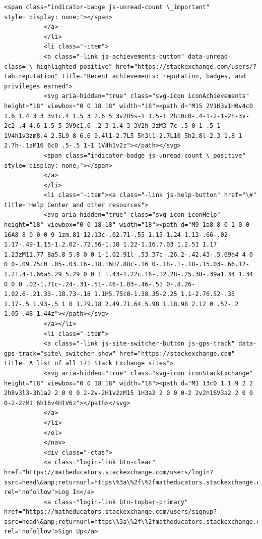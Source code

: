 \documentclass[11pt]{article}
\begin{document}
\begin{Verbatim}[commandchars=\\\{\}]
           <span class="indicator-badge js-unread-count \_important" style="display: none;"></span>
           </a>
           </li>
           <li class="-item">
           <a class="-link js-achievements-button" data-unread-class="\_highlighted-positive" href="https://stackexchange.com/users/?tab=reputation" title="Recent achievements: reputation, badges, and privileges earned">
           <svg aria-hidden="true" class="svg-icon iconAchievements" height="18" viewbox="0 0 18 18" width="18"><path d="M15 2V1H3v1H0v4c0 1.6 1.4 3 3 3v1c.4 1.5 3 2.6 5 3v2H5s-1 1.5-1 2h10c0-.4-1-2-1-2h-3v-2c2-.4 4.6-1.5 5-3V9c1.6-.2 3-1.4 3-3V2h-3zM3 7c-.5 0-1-.5-1-1V4h1v3zm8.4 2.5L9 8 6.6 9.4l1-2.7L5 5h3l1-2.7L10 5h2.8l-2.3 1.8 1 2.7h-.1zM16 6c0 .5-.5 1-1 1V4h1v2z"></path></svg>
           <span class="indicator-badge js-unread-count \_positive" style="display: none;"></span>
           </a>
           </li>
           <li class="-item"><a class="-link js-help-button" href="\#" title="Help Center and other resources">
           <svg aria-hidden="true" class="svg-icon iconHelp" height="18" viewbox="0 0 18 18" width="18"><path d="M9 1a8 8 0 1 0 0 16A8 8 0 0 0 9 1zm.81 12.13c-.02.71-.55 1.15-1.24 1.13-.66-.02-1.17-.49-1.15-1.2.02-.72.56-1.18 1.22-1.16.7.03 1.2.51 1.17 1.23zM11.77 8a5.8 5.8 0 0 1-1.02.91l-.53.37c-.26.2-.42.43-.5.69a4 4 0 0 0-.09.75c0 .05-.03.16-.18.16H7.88c-.16 0-.18-.1-.18-.15.03-.66.12-1.21.4-1.66a5.29 5.29 0 0 1 1.43-1.22c.16-.12.28-.25.38-.39a1.34 1.34 0 0 0 .02-1.71c-.24-.31-.51-.46-1.03-.46-.51 0-.8.26-1.02.6-.21.33-.18.73-.18 1.1H5.75c0-1.38.35-2.25 1.1-2.76.52-.35 1.17-.5 1.93-.5 1 0 1.79.18 2.49.71.64.5.98 1.18.98 2.12 0 .57-.2 1.05-.48 1.44z"></path></svg>
           </a></li>
           <li class="-item">
           <a class="-link js-site-switcher-button js-gps-track" data-gps-track="site\_switcher.show" href="https://stackexchange.com" title="A list of all 171 Stack Exchange sites">
           <svg aria-hidden="true" class="svg-icon iconStackExchange" height="18" viewbox="0 0 18 18" width="18"><path d="M1 13c0 1.1.9 2 2 2h8v3l3-3h1a2 2 0 0 0 2-2v-2H1v2zM15 1H3a2 2 0 0 0-2 2v2h16V3a2 2 0 0 0-2-2zM1 6h16v4H1V6z"></path></svg>
           </a>
           </li>
           </ol>
           </nav>
           <div class="-ctas">
           <a class="login-link btn-clear" href="https://matheducators.stackexchange.com/users/login?ssrc=head\&amp;returnurl=https\%3a\%2f\%2fmatheducators.stackexchange.com\%2f" rel="nofollow">Log In</a>
           <a class="login-link btn-topbar-primary" href="https://matheducators.stackexchange.com/users/signup?ssrc=head\&amp;returnurl=https\%3a\%2f\%2fmatheducators.stackexchange.com\%2f" rel="nofollow">Sign Up</a>

\end{Verbatim}
\end{document}
